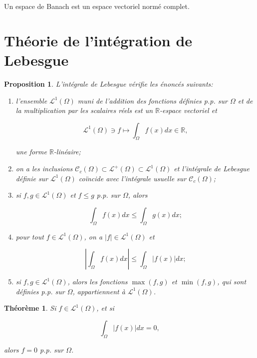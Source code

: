 \documentclass[10pt,a4paper,oneside]{article}
\newtheorem{theoreme}{Théorème}
\newtheorem{proposition}{Proposition}
\newenvironment{definition}[1][Definition]{\begin{trivlist}
\item[\hskip \labelsep {\bfseries #1}]}{\end{trivlist}}
\begin{document}
\begin{definition}
Un espace de Banach est un espace vectoriel normé complet.
\end{definition}

\section{Théorie de l'intégration de Lebesgue}

\begin{proposition}
L'intégrale de Lebesgue vérifie les énoncés suivants:

\begin{enumerate}
\item
l'ensemble $\mathcal{L}^1(\Omega)$ muni de l'addition des fonctions définies p.p. sur $\Omega$ et de la multiplication par les scalaires réels est un $\mathbb{R}$-espace vectoriel et

\[ \mathcal{L}^1(\Omega) \ni f \mapsto \int_\Omega f(x) dx \in \mathbb{R}, \]

une forme $\mathbb{R}$-linéaire;

\item
on a les inclusions $\mathcal{C}_c(\Omega) \subset \mathcal{L}^+(\Omega) \subset \mathcal{L}^1(\Omega)$ et l'intégrale de Lebesgue définie sur $\mathcal{L}^1(\Omega)$ coïncide avec l'intégrale usuelle sur $\mathcal{C}_c(\Omega)$;

\item
si $f,g \in \mathcal{L}^1(\Omega)$ et $f \leq g$ p.p. sur $\Omega$, alors

\[ \int_\Omega f(x) dx \leq \int_\Omega g(x) dx; \]

\item
pour tout $f \in \mathcal{L}^1(\Omega)$, on a $|f| \in \mathcal{L}^1(\Omega)$ et

\[ \left| \int_\Omega f(x) dx \right| \leq \int_\Omega |f(x)| dx; \]

\item
si $f,g \in \mathcal{L}^1(\Omega)$, alors les fonctions $\max(f,g)$ et $\min(f,g)$, qui sont définies p.p. sur $\Omega$, appartiennent à $\mathcal{L}^1(\Omega)$.
\end{enumerate}
\end{proposition}

\begin{theoreme}
Si $f \in \mathcal{L}^1(\Omega)$, et si

\[ \int_\Omega |f(x)| dx = 0, \]

alors $f = 0$ p.p. sur $\Omega$.
\end{theoreme}
\end{document}
